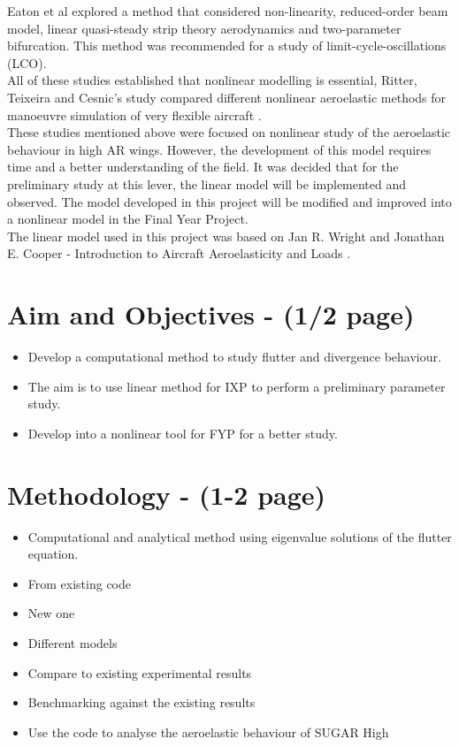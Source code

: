 \documentclass[11pt]{article}
\begin{document}
Eaton et al \cite{EatonNumericalWings} explored a method that considered non-linearity, reduced-order beam model, linear quasi-steady strip theory aerodynamics and two-parameter bifurcation. This method was recommended for a study of limit-cycle-oscillations (LCO).\\

All of these studies established that nonlinear modelling is essential, Ritter, Teixeira and Cesnic's study compared different nonlinear aeroelastic methods for manoeuvre simulation of very flexible aircraft \cite{Ritter2018ComparisonAircraft}.\\

These studies mentioned above were focused on nonlinear study of the aeroelastic behaviour in high AR wings. However, the development of this model requires time and a better understanding of the field. It was decided that for the preliminary study at this lever, the linear model will be implemented and observed. The model developed in this project will be modified and improved into a nonlinear model in the Final Year Project.\\

The linear model used in this project was based on Jan R. Wright and Jonathan E. Cooper - Introduction to Aircraft Aeroelasticity and Loads \cite{Wright2015INTRODUCTIONLOADS}. 


\section{Aim and Objectives - (1/2 page)}
\begin{itemize}
    \item Develop a computational method to study flutter and divergence behaviour.
    \item The aim is to use linear method for IXP to perform a preliminary parameter study.
    \item Develop into a nonlinear tool for FYP for a better study.
\end{itemize}

\section{Methodology - (1-2 page)}
\begin{itemize}
    \item Computational and analytical method using eigenvalue solutions of the flutter equation.
    \item From existing code
    \item New one
    \item Different models
    \item Compare to existing experimental results
    \item Benchmarking against the existing results
    \item Use the code to analyse the aeroelastic behaviour of SUGAR High
\end{itemize}
\end{document}
